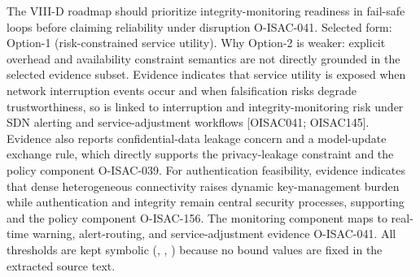  The VIII-D roadmap should prioritize integrity-monitoring readiness in fail-safe loops before claiming reliability under disruption O-ISAC-041.\markdownRendererOlItemEnd 
\markdownRendererOlEnd \markdownRendererInterblockSeparator
{}
\markdownRendererSectionEnd \markdownRendererSectionBegin
{}\markdownRendererInterblockSeparator
{}Selected form: Option-1 (risk-constrained service utility).\markdownRendererInterblockSeparator
{}\markdownRendererUlBeginTight
\markdownRendererUlItem Why Option-2 is weaker: explicit overhead and availability constraint semantics are not directly grounded in the selected evidence subset.\markdownRendererUlItemEnd 
\markdownRendererUlEndTight \markdownRendererInterblockSeparator
{}\markdownRendererParagraphSeparator
{}Evidence indicates that service utility is exposed when network interruption events occur and when falsification risks degrade trustworthiness, so  is linked to interruption and integrity-monitoring risk under SDN alerting and service-adjustment workflows [O\markdownRendererUnderscore{}ISAC\markdownRendererUnderscore{}041; O\markdownRendererUnderscore{}ISAC\markdownRendererUnderscore{}145]. Evidence also reports confidential-data leakage concern and a model-update exchange rule, which directly supports the privacy-leakage constraint  and the  policy component O-ISAC-039. For authentication feasibility, evidence indicates that dense heterogeneous connectivity raises dynamic key-management burden while authentication and integrity remain central security processes, supporting  and the  policy component O-ISAC-156. The monitoring component  maps to real-time warning, alert-routing, and service-adjustment evidence O-ISAC-041. All thresholds are kept symbolic (, , ) because no bound values are fixed in the extracted source text.\markdownRendererInterblockSeparator
